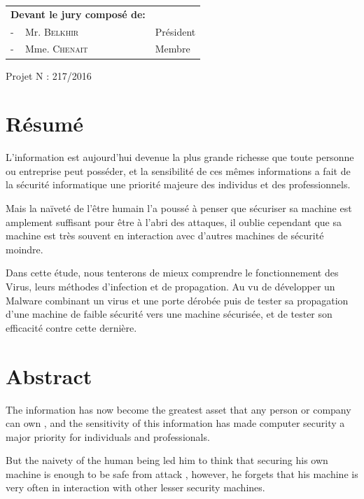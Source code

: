 \begin{table}[h]
    \begin{tabular}{p{6.5cm}p{5cm}}
    \textbf{Devant le jury composé de:}&\\
    - \,\,\, Mr. \textsc{Belkhir} & Président \\
    - \,\,\, Mme. \textsc{Chenait} & Membre \\
    \end{tabular}
\end{table}

\vspace{2cm}
\begin{center}
Projet N : 217/2016
\end{center}

\clearpage


\section*{Résumé} 
L’information est aujourd’hui devenue la plus grande richesse que toute personne ou entreprise peut posséder, et la sensibilité de ces mêmes informations a fait de la sécurité informatique une priorité majeure des individus et des professionnels.

Mais la naïveté de l’être humain l’a poussé à penser que sécuriser sa machine est amplement suffisant pour être à l’abri des attaques, il oublie cependant que sa machine est très souvent en interaction avec d’autres machines de sécurité moindre.

Dans cette étude, nous tenterons de mieux comprendre le fonctionnement des Virus, leurs méthodes d'infection et de propagation. Au vu de développer un Malware combinant un virus et une porte dérobée puis de tester sa propagation d'une machine de faible sécurité vers une machine sécurisée, et de tester son efficacité contre cette dernière. %

\section*{Abstract}
The information has now become the greatest asset that any person or company can own , and the sensitivity of this information has made computer security a major priority for individuals and professionals.

But the naivety of the human being led him to think that securing his own machine is  enough to be safe from attack , however, he forgets that his machine is very often in interaction with other lesser security machines.

